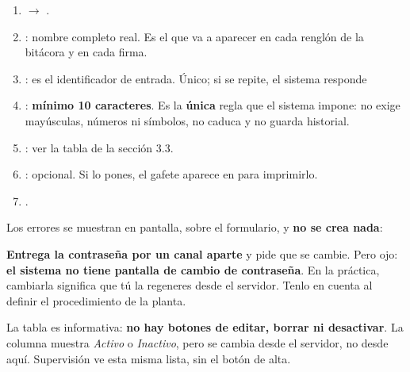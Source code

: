 
\begin{enumerate}
    \item {} $\rightarrow$ .
    \item {}: nombre completo real. Es el que va a aparecer en cada renglón
          de la bitácora y en cada firma.
    \item {}: es el identificador de entrada. Único; si se repite, el sistema
          responde 
    \item {}: \textbf{mínimo 10 caracteres}. Es la \textbf{única} regla
          que el sistema impone: no exige mayúsculas, números ni símbolos, no caduca y no
          guarda historial.
    \item {}: ver la tabla de la sección 3.3.
    \item {}: opcional. Si lo pones, el gafete aparece en
           para imprimirlo.
    \item {}.
\end{enumerate}


\vspace{6pt}

Los errores se muestran en pantalla, sobre el formulario, y \textbf{no se crea nada}:


\begin{cajaOjo}
\textbf{Entrega la contraseña por un canal aparte} y pide que se cambie. Pero ojo:
\textbf{el sistema no tiene pantalla de cambio de contraseña}. En la práctica, cambiarla
significa que tú la regeneres desde el servidor. Tenlo en cuenta al definir el
procedimiento de la planta.
\end{cajaOjo}

\newpage
{}


\vspace{6pt}

La tabla es informativa: \textbf{no hay botones de editar, borrar ni desactivar}. La
columna  muestra \textit{Activo} o \textit{Inactivo}, pero se cambia desde
el servidor, no desde aquí. Supervisión ve esta misma lista, sin el botón de alta.

